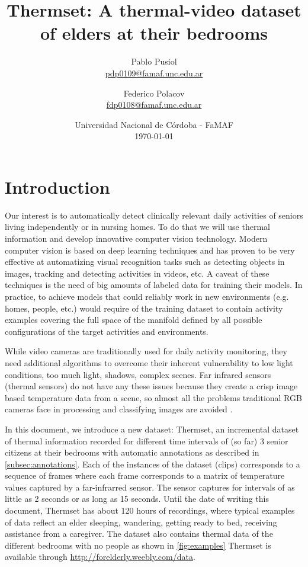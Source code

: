 \documentclass[oneside, twocolumn]{article}
\title{\LARGE Thermset: A thermal-video dataset of elders at their bedrooms} %
\author{Pablo Pusiol\\ \href{mailto:pdp0109@famaf.unc.edu.ar \qquad Pablo Pusiol }{pdp0109@famaf.unc.edu.ar} \and Federico Polacov \\\href{mailto:fdp0108@famaf.unc.edu.ar}{fdp0108@famaf.unc.edu.ar}}
\date{Universidad Nacional de C\'ordoba - FaMAF \\ \today}
\newcommand\TotalHoursOfRecording{120}
\newcommand\NumberOfPeople{3}
\begin{document}
\maketitle


\section{Introduction}
\label{sec:introduction}
Our interest is to automatically detect clinically relevant daily activities of seniors living independently
or in nursing homes. To do that we will use thermal information and develop innovative computer vision technology.
Modern computer vision is based on deep learning techniques and has proven to be very effective at automatizing
visual recognition tasks such as detecting objects in images, tracking and detecting activities in videos, etc.
A caveat of these techniques is the need of big amounts of labeled data for training their models. In practice,
to achieve  models that could reliably work in new  environments (e.g. homes, people, etc.) would require of the
training dataset to contain activity examples covering the full space of the manifold defined by all possible
configurations of the target activities and environments.

While video cameras are traditionally used for daily activity monitoring, they need additional algorithms to
overcome their inherent vulnerability to low light conditions, too much light, shadows, complex scenes. Far
infrared sensors (thermal sensors) do not have any these issues because they create a crisp image based temperature
data from a scene, so almost all the problems traditional RGB cameras face in processing and classifying images are
avoided \cite{chengl}.

In this document, we introduce a new dataset: Thermset, an incremental dataset of thermal information recorded
for different time intervals of (so far) \NumberOfPeople{} senior citizens at their bedrooms with automatic
annotations as described in \autoref{subsec:annotations}. Each of the instances of the dataset (clips) corresponds
 to a sequence of frames where each frame corresponds to a matrix of temperature values captured by a
 far-infrarred sensor. The sensor captures for intervals of as little as 2 seconds or as long as 15 seconds. Until
 the date of writing this document, Thermset has about \TotalHoursOfRecording{} hours of recordings, where typical
 examples of data reflect an elder sleeping, wandering, getting ready to bed, receiving assistance from a caregiver.
 The dataset also contains thermal data of the different bedrooms with no people as shown in \autoref{fig:examples}
 Thermset is available through \url{http://forelderly.weebly.com/data}.
\end{document}
